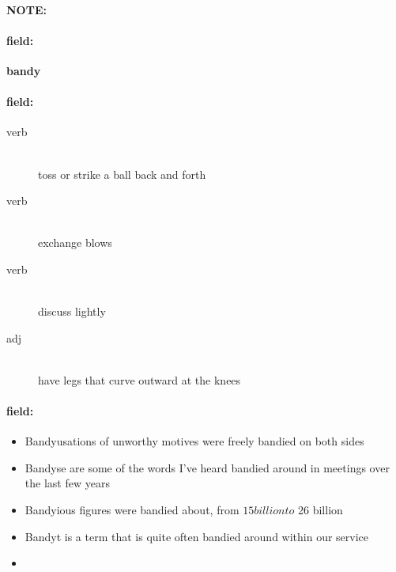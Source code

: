 \documentclass[12pt]{article}
\newenvironment{note}{\paragraph{NOTE:}}{}
\newenvironment{field}{\paragraph{field:}}{}
\begin{document}
\begin{note}
\begin{field}
\textbf{\large bandy}
\end{field}


\begin{field}
\begin{description}
\item[verb] \hfill \\ 
toss or strike a ball back and forth

\item[verb] \hfill \\ 
exchange blows

\item[verb] \hfill \\ 
discuss lightly

\item[adj] \hfill \\ 
have legs that curve outward at the knees

\end{description}
\end{field}

\begin{field}
\begin{itemize}
\item Bandyusations of unworthy motives were freely bandied on both sides
\item Bandyse are some of the words I've heard bandied around in meetings over the last few years
\item Bandyious figures were bandied about, from $ 15 billion to $ 26 billion
\item Bandyt is a term that is quite often bandied around within our service
\item 
\end{itemize}
\end{field}
\end{note}
\end{document}
